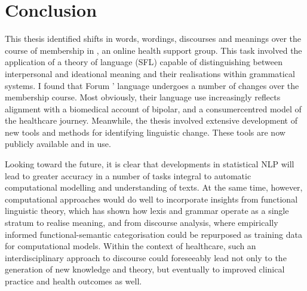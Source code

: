 

\section{Conclusion}

This thesis identified shifts in words, wordings, discourses and meanings over the course of membership in , an online health support group. This task involved the application of a theory of language (\gls{SFL}) capable of distinguishing between interpersonal and ideational meaning and their realisations within grammatical systems. I found that \gls{Forum} ' language undergoes a number of changes over the membership course. Most obviously, their language use increasingly reflects alignment with a biomedical account of \gls{bipolar}, and a \gls{consumercentred} model of the healthcare journey. Meanwhile, the thesis involved extensive development of new tools and methods for identifying linguistic change. These tools are now publicly available and in use.

Looking toward the future, it is clear that developments in statistical \gls{NLP} will lead to greater accuracy in a number of tasks integral to automatic computational modelling and understanding of texts. At the same time, however, computational approaches would do well to incorporate insights from functional linguistic theory, which has shown how lexis and grammar operate as a single stratum to realise meaning, and from discourse analysis, where empirically informed functional\hyp{}semantic categorisation could be repurposed as training data for computational models. Within the context of healthcare, such an interdisciplinary approach to discourse could foreseeably lead not only to the generation of new knowledge and theory, but eventually to improved clinical practice and health outcomes as well.

